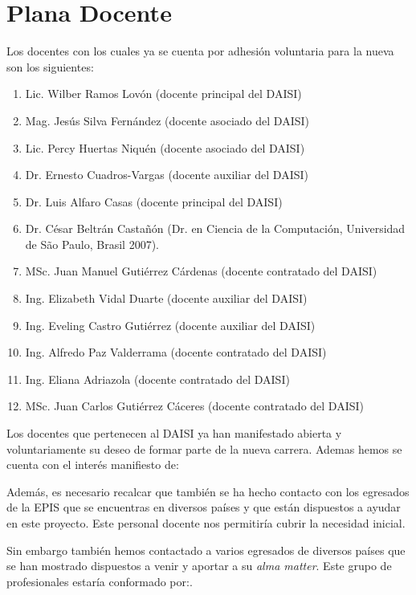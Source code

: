 \section{Plana Docente}\label{sec:staff}
Los docentes con los cuales ya se cuenta por adhesión voluntaria para la nueva \SchoolFullName son los siguientes:

\begin{enumerate}
\item Lic. Wilber Ramos Lovón (docente principal del DAISI)
\item Mag. Jesús Silva Fernández (docente asociado del DAISI)
\item Lic. Percy Huertas Niquén (docente asociado del DAISI)
\item Dr.  Ernesto Cuadros-Vargas (docente auxiliar del DAISI)
\item Dr.  Luis Alfaro Casas (docente principal del DAISI)
\item Dr. César Beltrán Castañón (Dr. en Ciencia de la Computación, Universidad de S\~ao Paulo, Brasil 2007).
\item MSc. Juan Manuel Gutiérrez Cárdenas (docente contratado del DAISI)
\item Ing. Elizabeth Vidal Duarte (docente auxiliar del DAISI)
\item Ing. Eveling Castro Gutiérrez (docente auxiliar del DAISI)
\item Ing. Alfredo Paz Valderrama (docente contratado del DAISI)
\item Ing. Eliana Adriazola (docente contratado del DAISI)
\item MSc. Juan Carlos Gutiérrez Cáceres (docente contratado del DAISI)
\end{enumerate}

Los docentes que pertenecen al DAISI ya han manifestado abierta y voluntariamente su deseo de formar parte de la nueva carrera. Ademas hemos se cuenta con el interés manifiesto de:

\begin{enumerate}
\end{enumerate}

Además, es necesario recalcar que también se ha hecho contacto con los egresados de la EPIS que se encuentras en diversos países y que están dispuestos a ayudar en este proyecto. Este personal docente nos permitiría cubrir la necesidad inicial.

Sin embargo también hemos contactado a varios egresados de diversos países que se han mostrado dispuestos a venir y aportar a su \textit{alma matter}. Este grupo de profesionales estaría conformado por:.

